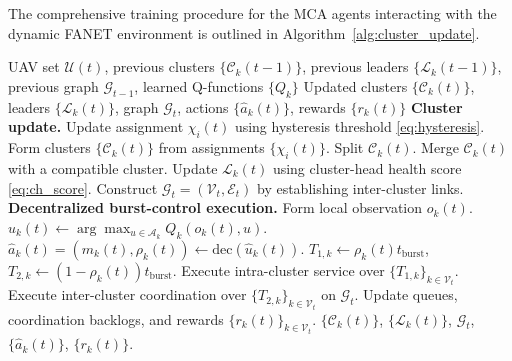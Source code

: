 The comprehensive training procedure for the MCA agents interacting with the dynamic FANET environment is outlined in Algorithm~\ref{alg:cluster_update}.

\begin{algorithm}[t]
\caption{Decentralized Cluster Update and Burst-Control Execution}
\label{alg:cluster_update}
\begin{algorithmic}[1]
\Require UAV set $\mathcal{U}(t)$, previous clusters $\{\mathcal{C}_k(t-1)\}$, previous leaders $\{\mathcal{L}_k(t-1)\}$, previous graph $\mathcal{G}_{t-1}$, learned Q-functions $\{Q_k\}$
\Ensure Updated clusters $\{\mathcal{C}_k(t)\}$, leaders $\{\mathcal{L}_k(t)\}$, graph $\mathcal{G}_t$, actions $\{\hat{a}_k(t)\}$, rewards $\{r_k(t)\}$
\State \textbf{Cluster update.}
    \State Update assignment $\chi_i(t)$ using hysteresis threshold \eqref{eq:hysteresis}.
\EndFor
\State Form clusters $\{\mathcal{C}_k(t)\}$ from assignments $\{\chi_i(t)\}$.
        \State Split $\mathcal{C}_k(t)$.
    \EndIf
        \State Merge $\mathcal{C}_k(t)$ with a compatible cluster.
    \EndIf
        \State Update $\mathcal{L}_k(t)$ using cluster-head health score \eqref{eq:ch_score}.
    \EndIf
\EndFor
\State Construct $\mathcal{G}_t = (\mathcal{V}_t, \mathcal{E}_t)$ by establishing inter-cluster links.
\State \textbf{Decentralized burst-control execution.}
    \State Form local observation $o_k(t)$.
    \State $\hat{u}_k(t) \leftarrow \arg\max_{u \in \mathcal{A}_k} Q_k(o_k(t), u)$.
    \State $\hat{a}_k(t) = (m_k(t), \rho_k(t)) \leftarrow \text{dec}(\hat{u}_k(t))$.
    \State $T_{1,k} \leftarrow \rho_k(t) t_{\text{burst}}$, $T_{2,k} \leftarrow (1 - \rho_k(t)) t_{\text{burst}}$.
\EndFor
\State Execute intra-cluster service over $\{T_{1,k}\}_{k \in \mathcal{V}_t}$.
\State Execute inter-cluster coordination over $\{T_{2,k}\}_{k \in \mathcal{V}_t}$ on $\mathcal{G}_t$.
\State Update queues, coordination backlogs, and rewards $\{r_k(t)\}_{k \in \mathcal{V}_t}$.
\State \Return $\{\mathcal{C}_k(t)\}$, $\{\mathcal{L}_k(t)\}$, $\mathcal{G}_t$, $\{\hat{a}_k(t)\}$, $\{r_k(t)\}$.
\end{algorithmic}
\end{algorithm}

